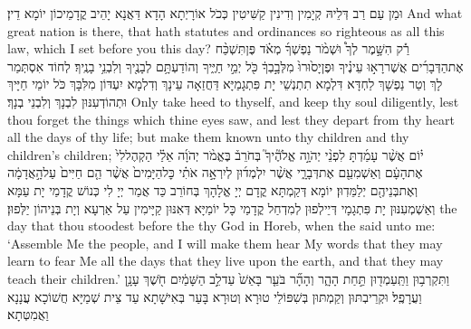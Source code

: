 {וּמַן עַם רַב דְּלֵיהּ קְיָמִין וְדִינִין קַשִּׁיטִין כְּכֹל אוֹרָיְתָא הָדָא דַּאֲנָא יָהֵיב קֳדָמֵיכוֹן יוֹמָא דֵין׃}
{And what great nation is there, that hath statutes and ordinances so righteous as all this law, which I set before you this day?}{}
{רַ֡ק הִשָּׁ֣מֶר לְךָ֩ וּשְׁמֹ֨ר נַפְשְׁךָ֜ מְאֹ֗ד פֶּן\maqqaf תִּשְׁכַּ֨ח אֶת\maqqaf הַדְּבָרִ֜ים אֲשֶׁר\maqqaf רָא֣וּ עֵינֶ֗יךָ וּפֶן\maqqaf יָס֙וּרוּ֙ מִלְּבָ֣בְךָ֔ כֹּ֖ל יְמֵ֣י חַיֶּ֑יךָ וְהוֹדַעְתָּ֥ם לְבָנֶ֖יךָ וְלִבְנֵ֥י בָנֶֽיךָ׃}
{לְחוֹד אִסְתְּמַר לָךְ וְטַר נַפְשָׁךְ לַחְדָּא דִּלְמָא תִתְנְשֵׁי יָת פִּתְגָמַיָּא דַּחֲזַאָה עֵינָךְ וְדִלְמָא יִעְדּוֹן מִלִּבָּךְ כֹּל יוֹמֵי חַיָּיךְ וּתְהוֹדְעִנּוּן לִבְנָךְ וְלִבְנֵי בְנָךְ׃}
{Only take heed to thyself, and keep thy soul diligently, lest thou forget the things which thine eyes saw, and lest they depart from thy heart all the days of thy life; but make them known unto thy children and thy children’s children;}{}
{י֗וֹם אֲשֶׁ֨ר עָמַ֜דְתָּ לִפְנֵ֨י יְהֹוָ֣ה אֱלֹהֶ֘יךָ֮ בְּחֹרֵב֒ בֶּאֱמֹ֨ר יְהֹוָ֜ה אֵלַ֗י הַקְהֶל\maqqaf לִי֙ אֶת\maqqaf הָעָ֔ם וְאַשְׁמִעֵ֖ם אֶת\maqqaf דְּבָרָ֑י אֲשֶׁ֨ר יִלְמְד֜וּן לְיִרְאָ֣ה אֹתִ֗י כׇּל\maqqaf הַיָּמִים֙ אֲשֶׁ֨ר הֵ֤ם חַיִּים֙ עַל\maqqaf הָ֣אֲדָמָ֔ה וְאֶת\maqqaf בְּנֵיהֶ֖ם יְלַמֵּדֽוּן׃}
{יוֹמָא דְּקַמְתָּא קֳדָם יְיָ אֱלָהָךְ בְּחוֹרֵב כַּד אֲמַר יְיָ לִי כְּנוֹשׁ קֳדָמַי יָת עַמָּא וְאַשְׁמְעִנּוּן יָת פִּתְגָמָי דְּיֵילְפוּן לְמִדְחַל קֳדָמַי כָּל יוֹמַיָּא דְּאִנּוּן קַיָּימִין עַל אַרְעָא וְיָת בְּנֵיהוֹן יַלְּפוּן׃}
{the day that thou stoodest before the \lord\space thy God in Horeb, when the \lord\space said unto me: ‘Assemble Me the people, and I will make them hear My words that they may learn to fear Me all the days that they live upon the earth, and that they may teach their children.’}{}
{וַתִּקְרְב֥וּן וַתַּֽעַמְד֖וּן תַּ֣חַת הָהָ֑ר וְהָהָ֞ר בֹּעֵ֤ר בָּאֵשׁ֙ עַד\maqqaf לֵ֣ב הַשָּׁמַ֔יִם חֹ֖שֶׁךְ עָנָ֥ן וַעֲרָפֶֽל׃}
{וּקְרֵיבְתּוּן וְקַמְתּוּן בְּשִׁפּוֹלֵי טוּרָא וְטוּרָא בָּעַר בְּאִישָׁתָא עַד צֵית שְׁמַיָּא חֲשׁוֹכָא עֲנָנָא וַאֲמִטְּתָא׃}
